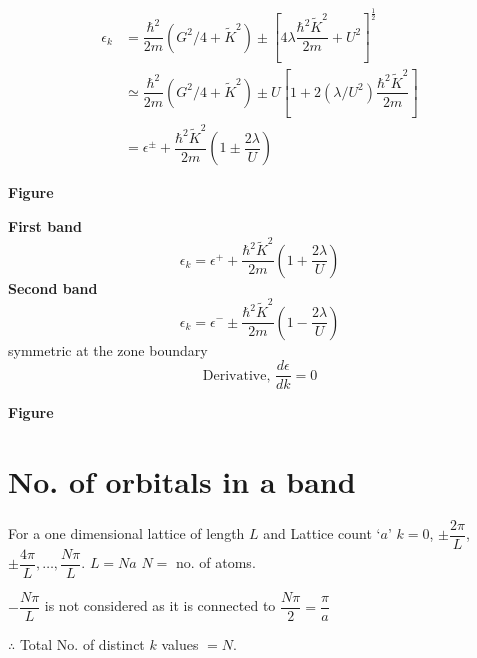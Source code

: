 \begin{align*}
\epsilon_{k} &= \dfrac{\hbar^{2}}{2m}\left(G^{2}/4+\widetilde{K}^{2}\right)\pm \left[4\lambda \dfrac{\hbar^{2}\widetilde{K}^{2}}{2m}+U^{2}\right]^{\frac{1}{2}}\\
&\simeq \dfrac{\hbar^{2}}{2m}\left(G^{2}/4+\widetilde{K}^{2}\right)\pm U \left[1+2(\lambda/U^{2})\dfrac{\hbar^{2}\widetilde{K}^{2}}{2m}\right]\\
&= \epsilon^{\pm}+\dfrac{\hbar^{2}\widetilde{K}^{2}}{2m}\left(1\pm \dfrac{2\lambda}{U}\right)
\end{align*}
\begin{center}
{\bf Figure}
\end{center}

\noindent
{\bf First band}
$$
\epsilon_{k}=\epsilon^{+}+\dfrac{\hbar^{2}\widetilde{K}^{2}}{2m}\left(1+\dfrac{2\lambda}{U}\right)
$$
{\bf Second band}
$$
\epsilon_{k}=\epsilon^{-}\pm \dfrac{\hbar^{2}\widetilde{K}^{2}}{2m}\left(1-\dfrac{2\lambda}{U}\right)
$$
symmetric at the zone boundary
$$
\text{Derivative, } \dfrac{d\epsilon}{dk}=0
$$
\begin{center}
{\bf Figure}
\end{center}

\section*{No. of orbitals in a band}

For a one dimensional lattice of length $L$ and Lattice count `$a$' $k=0$, $\pm \dfrac{2\pi}{L}$, $\pm \dfrac{4\pi}{L},\ldots,\dfrac{N\pi}{L}$. $L=Na$ $N=$ no. of atoms.

$-\dfrac{N\pi}{L}$ is not considered as it is connected to $\dfrac{N\pi}{2}=\dfrac{\pi}{a}$

$\therefore$ Total No. of distinct $k$ values $=N$.

